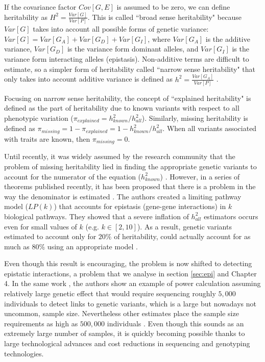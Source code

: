 If the covariance factor $Cov[G, E]$ is assumed to be zero, we can define heritability as $H^2 = \frac{Var[G] }{ Var[P]}$. This is called ``broad sense heritability" because $Var[G]$ takes into account all possible forms of genetic variance: $Var[G] = Var[G_A] + Var[G_D] + Var[G_I]$, where $Var[G_A]$ is the additive variance, $Var[G_D]$ is the variance form dominant alleles, and $Var[G_I]$ is the variance form interacting alleles (epistasis). Non-additive terms are difficult to estimate, so a simpler form of heritability called ``narrow sense heritability" that only takes into account additive variance is defined as $h^2 = \frac{ Var[G_A] }{ Var[P] }$ \cite{zuk2012mystery}.

Focusing on narrow sense heritability, the concept of ``explained heritability" is defined as the part of heritability due to known variants with respect to all phenotypic variation ($\pi_{explained} = h^2_{known} / h^2_{all}$). Similarly, missing heritability is defined as $\pi_{missing} = 1 - \pi_{explained} = 1 - h^2_{known} / h^2_{all}$. When all variants associated with traits are known, then $\pi_{missing} = 0$.

Until recently, it was widely assumed by the research community that the problem of missing heritability lied in finding the appropriate genetic variants to account for the numerator of the equation ($h^2_{known}$) \cite{zuk2012mystery}. However, in a series of theorems published recently, it has been proposed that there is a problem in the way the denominator is estimated \cite{zuk2012mystery}. The authors created a limiting pathway model ($LP(k)$) that accounts for epistasis (gene-gene interactions) in $k$ biological pathways. They showed that a severe inflation of $h^2_{all}$ estimators occurs even for small values of $k$ (e.g. $k \in [2,10]$). As a result, genetic variants estimated to account only for $20\%$ of heritability, could actually account for as much as $80\%$ using an appropriate model \cite{zuk2012mystery}.

Even though this result is encouraging, the problem is now shifted to detecting epistatic interactions, a problem that we analyse in section \ref{sec:epi} and Chapter 4. In the same work \cite{zuk2012mystery}, the authors show an example of power calculation assuming relatively large genetic effect that would require sequencing roughly $5,000$ individuals to detect links to genetic variants, which is a large but nowadays not uncommon, sample size. Nevertheless other estimates place the sample size requirements as high as  $500,000$ individuals \cite{zuk2012mystery}. Even though this sounds as an extremely large number of samples, it is quickly becoming possible thanks to large technological advances and cost reductions in sequencing and genotyping technologies.

